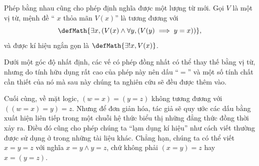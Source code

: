 Phép bằng nhau cũng cho phép định nghĩa được một lượng từ mới. Gọi $V$ là một vị từ, mệnh đề `` $x$ thỏa mãn $V(x)$'' là tương đương với
\begin{equation*}
   \defMath{\exists x, \left(V(x) \land \forall y, (V(y) \implies y = x)\right)},
\end{equation*}
và được kí hiệu ngắn gọn là $\defMath{\exists ! x, V(x)}$.

Dưới một góc độ nhất định, các vế có phép đồng nhất có thể thay thế bằng vị từ, nhưng do tính hữu dụng rất cao của phép này nên dấu ``$=$'' và một số tính chất cần thiết của nó mà sau này chúng ta nghiên cứu sẽ đều được thêm vào.

Cuối cùng, về mặt logic, $(w = x) = (y = z)$ không tương đương với $((w = x) = y) = z$. Nhưng để đơn giản hóa, tác giả sẽ quy ước các dấu bằng xuất hiện liên tiếp trong một chuỗi hệ thức biểu thị những đẳng thức đồng thời xảy ra. Điều đó cũng cho phép chúng ta ``lạm dụng kí hiệu'' như cách viết thường được sử dụng ở trong những tài liệu khác. Chẳng hạn, chúng ta có thể viết $x = y = z$ với nghĩa $x = y \land y = z$, chứ không phải $(x = y) = z$ hay $x = (y = z)$.